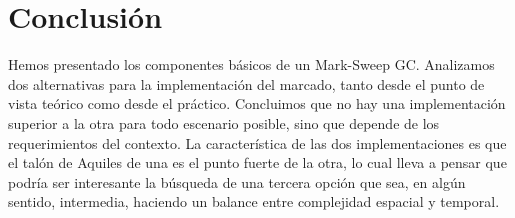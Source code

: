 \section{Conclusión}
Hemos presentado los componentes básicos de un Mark-Sweep GC. Analizamos dos alternativas para la implementación del marcado, tanto desde el punto de vista teórico como desde el práctico. Concluimos que no hay una implementación superior a la otra para todo escenario posible, sino que depende de los requerimientos del contexto. La característica de las dos implementaciones es que el talón de Aquiles de una es el punto fuerte de la otra, lo cual lleva a pensar que podría ser interesante la búsqueda de una tercera opción que sea, en algún sentido, intermedia, haciendo un balance entre complejidad espacial y temporal.